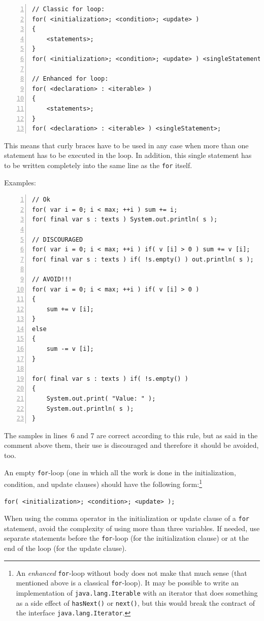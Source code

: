 \documentclass[12pt,a4paper,titlepage, parskip=half, headsepline, footsepline, cleardoubleplain]{scrbook}
\begin{document}
\begin{lstlisting}[numbers=left]
// Classic for loop:
for( <initialization>; <condition>; <update> )
{
    <statements>;
}
for( <initialization>; <condition>; <update> ) <singleStatement>;

// Enhanced for loop:
for( <declaration> : <iterable> )
{
    <statements>;
}
for( <declaration> : <iterable> ) <singleStatement>;
\end{lstlisting}

This means that curly braces have to be used in any case when more than one statement has to be executed in the loop. In addition, this single statement has to be written completely into the same line as the \lstinline|for| itself. 

Examples:
\begin{lstlisting}[numbers=left]
// Ok
for( var i = 0; i < max; ++i ) sum += i;
for( final var s : texts ) System.out.println( s );

// DISCOURAGED
for( var i = 0; i < max; ++i ) if( v [i] > 0 ) sum += v [i];
for( final var s : texts ) if( !s.empty() ) out.println( s );

// AVOID!!!
for( var i = 0; i < max; ++i ) if( v [i] > 0 )
{
    sum += v [i];
}
else
{
    sum -= v [i];
}

for( final var s : texts ) if( !s.empty() )
{
    System.out.print( "Value: " );
    System.out.println( s );
}
\end{lstlisting}
The samples in lines~6 and 7 are correct according to this rule, but as said in the comment above them, their use is discouraged and therefore it should be avoided, too.

An empty \lstinline|for|-loop (one in which all the work is done in the initialization, condition, and update clauses) should have the following form:\footnote{An \textit{enhanced} \lstinline|for|-loop without body does not make that much sense (that mentioned above is a classical \lstinline|for|-loop). It may be possible to write an implementation of \lstinline|java.lang.Iterable| with an iterator that does something as a side effect of \lstinline|hasNext()| or \lstinline|next()|, but this would break the contract of the interface \lstinline|java.lang.Iterator|.}

\begin{lstlisting}
for( <initialization>; <condition>; <update> );
\end{lstlisting}

When using the comma operator in the initialization or update clause of a \lstinline|for| statement, avoid the complexity of using more than three variables. If needed, use separate statements before the \lstinline|for|-loop (for the initialization clause) or at the end of the loop (for the update clause).
\end{document}
